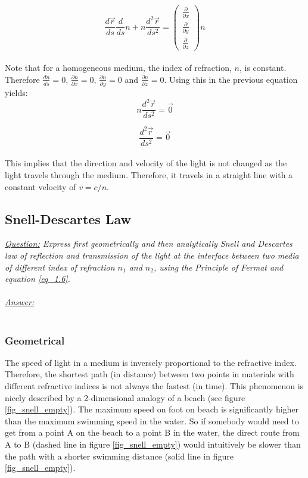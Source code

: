\documentclass{article}
\def\Nabla{
	\begin{pmatrix}
		\frac{\partial}{\partial {x}} \\
		\frac{\partial}{\partial {y}} \\
		\frac{\partial}{\partial {z}}
	\end{pmatrix}}
\begin{document}
\begin{equation}
	\frac{d \vec{r}}{ds} \frac{d}{ds} n + n \frac{d^2 \vec{r}}{ds^2} = \Nabla n
\end{equation} \\

Note that for a homogeneous medium, the index of refraction, $n$, is constant. Therefore $\frac{dn}{ds} = 0$, $\frac{\partial n}{\partial x} = 0$, $\frac{\partial n}{\partial y} = 0$ and $\frac{\partial n}{\partial z} = 0$. Using this in the previous equation yields: \\

\begin{equation}
	 n \frac{d^2 \vec{r}}{ds^2} = \vec{0}
\end{equation}

\begin{equation}
	 \frac{d^2 \vec{r}}{ds^2} = \vec{0}
\end{equation} \\


This implies that the direction and velocity of the light is not changed as the light travels through the medium. Therefore, it travels in a straight line with a constant velocity of $ v = c/n $. \\

\subsection{Snell-Descartes Law}

\textit{\underline{Question:} Express first geometrically and then analytically Snell and Descartes law of reflection and transmission of the light at the interface between two media of different index of refraction $n_1$ and $n_2$, using the Principle of Fermat and equation \ref{eq_1.6}.}\\
\\
\textit{\underline{Answer:}} \\
\\

\subsubsection{Geometrical}
The speed of light in a medium is inversely proportional to the refractive index. Therefore, the shortest path (in distance) between two points in materials with different refractive indices is not always the fastest (in time). This phenomenon is nicely described by a 2-dimensional analogy of a beach (see figure \ref{fig_snell_empty}). The maximum speed on foot on beach is significantly higher than the maximum swimming speed in the water. So if somebody would need to get from a point A on the beach to a point B in the water, the direct route from A to B (dashed line in figure \ref{fig_snell_empty}) would intuitively be slower than the path with a shorter swimming distance (solid line in figure \ref{fig_snell_empty}).
\end{document}
